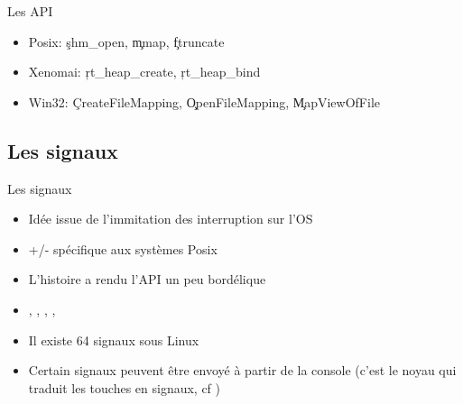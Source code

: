 \begin{frame}[fragile=singleslide]{Les API}
  \begin{itemize}
  \item Posix: \c{shm_open}, \c{mmap}, \c{ftruncate}
  \item Xenomai: \c{rt_heap_create}, \c{rt_heap_bind}
  \item     Win32:     \c{CreateFileMapping},     \c{OpenFileMapping},
    \c{MapViewOfFile}
  \end{itemize}
\end{frame}

\subsection{Les signaux}

\begin{frame}[fragile=singleslide]{Les signaux}
  \begin{itemize}
  \item Idée issue de l'immitation des interruption sur l'OS
  \item +/- spécifique aux systèmes Posix
  \item L'histoire a rendu l'API un peu bordélique
  \item     {},     ,    ,
    , 
  \item Il existe 64 signaux sous Linux
  \item Certain  signaux peuvent  être envoyé à  partir de  la console
    (c'est  le   noyau  qui  traduit   les  touches  en   signaux,  cf
    )
  \end{itemize}
\end{frame}

